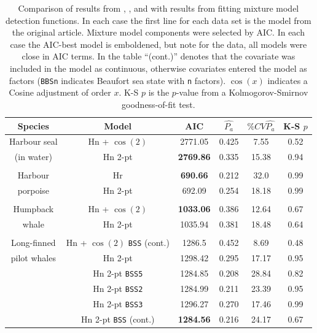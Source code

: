 \documentclass[useAMS,referee,usenatbib]{biom}
\begin{document}
\begin{table}
\caption[]{Comparison of results from , ,  and  with results from fitting mixture model detection functions. In each case the first line for each data set is the model from the original article. Mixture model components were selected by AIC. In each case the AIC-best model is emboldened, but note for the  data, all models were close in AIC terms. In the table ``(cont.)'' denotes that the covariate was included in the model as continuous, otherwise covariates entered the model as factors (\texttt{BBSn} indicates Beaufort sea state with \texttt{n} factors). $\cos(x)$ indicates a Cosine adjustment of order $x$. K-S $p$ is the $p$-value from a Kolmogorov-Smirnov goodness-of-fit test.}
\centering
\begin{tabular}{c c c c c c}
\hline \hline
Species & Model & AIC & $\hat{P_a}$ & $\% CV \hat{P_a}$ & K-S $p$\\
\hline
Harbour seal & Hn + $\cos(2)$ & 2771.05 & 0.425 & 7.55 & 0.52\\
(in water) & Hn 2-pt  & \textbf{2769.86} & 0.335 & 15.38 & 0.94\\
&&&&&\\
Harbour & Hr  & \textbf{690.66} & 0.212 & 32.0 & 0.99\\
porpoise & Hn 2-pt & 692.09 & 0.254 & 18.18 & 0.99\\
&&&&&\\
Humpback & Hn + $\cos(2)$ & \textbf{1033.06} & 0.386 & 12.64 & 0.67 \\
whale & Hn 2-pt & 1035.94 & 0.381 & 18.48 & 0.64 \\
&&&&&\\
Long-finned & Hn + $\cos(2)$ \texttt{BSS} (cont.) & 1286.5 & 0.452 & 8.69 & 0.48\\ %
pilot whales  & Hn 2-pt &  1298.42  &  0.295  &  17.17  &  0.95 \\
 & Hn 2-pt \texttt{BSS5} &  1284.85  &  0.208  &  28.84  &  0.82 \\
 & Hn 2-pt  \texttt{BSS2}  &  1284.99  &  0.211  &  23.39  &  0.95 \\
 & Hn 2-pt  \texttt{BSS3}  &  1296.27  &  0.270  &  17.46  &  0.99 \\
 & Hn 2-pt  \texttt{BSS} (cont.) &  \textbf{1284.56}  &  0.216  &  24.17  &  0.67 \\

\end{tabular}
\end{table}
\end{document}
